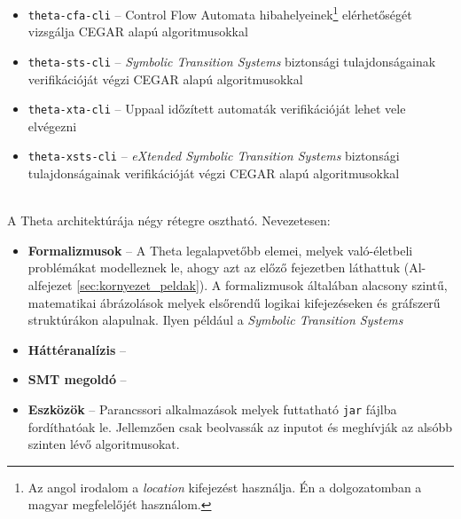 \begin{itemize}
	\item \verb+theta-cfa-cli+ -- Control Flow Automata hibahelyeinek\footnote{Az angol irodalom a \emph{location} kifejezést használja. Én a dolgozatomban a magyar megfelelőjét használom.} elérhetőségét vizsgálja CEGAR alapú algoritmusokkal
	
	\item \verb+theta-sts-cli+ -- \emph{Symbolic Transition Systems} biztonsági tulajdonságainak verifikációját végzi CEGAR alapú algoritmusokkal
	
	\item \verb+theta-xta-cli+ -- Uppaal időzített automaták verifikációját lehet vele elvégezni
	
	\item \verb+theta-xsts-cli+ -- \emph{eXtended Symbolic Transition Systems} biztonsági tulajdonságainak verifikációját végzi CEGAR alapú algoritmusokkal
\end{itemize}
\ \\
A Theta architektúrája négy rétegre osztható. Nevezetesen:

\begin{itemize}
	\item \textbf{Formalizmusok} -- A Theta legalapvetőbb elemei, melyek való-életbeli problémákat modelleznek le, ahogy azt az előző fejezetben láthattuk (Al-alfejezet \ref{sec:kornyezet_peldak}). A formalizmusok általában alacsony szintű, matematikai ábrázolások melyek elsőrendű logikai kifejezéseken és gráfszerű struktúrákon alapulnak. Ilyen például a \emph{Symbolic Transition Systems} 

	\item \textbf{Háttéranalízis} -- 
	
	\item \textbf{SMT megoldó} -- 
	
	\item \textbf{Eszközök} -- Parancssori alkalmazások melyek futtatható \verb+jar+ fájlba fordíthatóak le. Jellemzően csak beolvassák az inputot és meghívják az alsóbb szinten lévő algoritmusokat. 
	
\end{itemize}




























